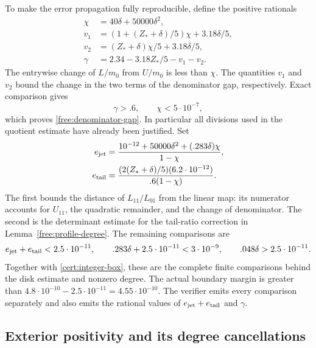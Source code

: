 To make the error propagation fully reproducible, define the positive
rationals
\begin{align*}
 \chi&=40\delta+50000\delta^2,\\
 v_1&=(1+(Z_*+\delta)/5)\chi+3.18\delta/5,\\
 v_2&=(Z_*+\delta)\chi/5+3.18\delta/5,\\
 \gamma&=2.34-3.18Z_*/5-v_1-v_2.
\end{align*}
The entrywise change of $L/m_0$ from $U/m_0$ is less than $\chi$.
The quantities $v_1$ and $v_2$ bound the change in the two terms of
the denominator gap, respectively.  Exact comparison gives
\[
 \gamma>.6,\qquad \chi<5\cdot10^{-7},
\]
which proves \eqref{free:denominator-gap}.  In particular all divisions
used in the quotient estimate have already been justified.
Set
\begin{align}\label{cert:ratio-errors}
 e_{\rm jet}&=
 \frac{10^{-12}+50000\delta^2+(.283\delta)\chi}{1-\chi},\notag\\
 e_{\rm tail}&=
 \frac{(2(Z_*+\delta)/5)(6.2\cdot10^{-12})}{.6(1-\chi)}.
\end{align}
The first bounds the distance of $L_{11}/L_{01}$ from the linear map:
its numerator accounts for $U_{11}$, the quadratic remainder, and
the change of denominator.  The second is the determinant estimate
for the tail-ratio correction in Lemma~\ref{free:profile-degree}.
The remaining comparisons are
\begin{equation}\label{cert:degree-comparisons}
 e_{\rm jet}+e_{\rm tail}<2.5\cdot10^{-11},\qquad
 .283\delta+2.5\cdot10^{-11}<3\cdot10^{-9},\qquad
 .048\delta>2.5\cdot10^{-11}.
\end{equation}
Together with \eqref{cert:integer-box}, these are the complete finite
comparisons behind the disk estimate and nonzero degree.  The actual
boundary margin is greater than
$4.8\cdot10^{-10}-2.5\cdot10^{-11}=4.55\cdot10^{-10}$.
The verifier emits every comparison separately and also emits the
rational values of $e_{\rm jet}+e_{\rm tail}$ and $\gamma$.

\subsection{Exterior positivity and its degree cancellations}\label{cert:exterior}

